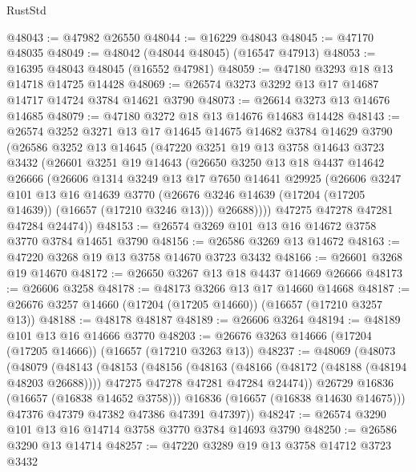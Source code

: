 \begin{lexlean}{RustStd}
\begin{coremodule}
@48043 := @47982 @26550
@48044 := @16229 @48043
@48045 := @47170 @48035
@48049 := @48042 (@48044 @48045) (@16547 @47913)
@48053 := @16395 @48043 @48045 (@16552 @47981)
@48059 := @47180 @3293 @18 @13 @14718 @14725 @14428
@48069 := @26574 @3273 @3292 @13 @17 @14687 @14717 @14724 @3784 @14621 @3790
@48073 := @26614 @3273 @13 @14676 @14685
@48079 := @47180 @3272 @18 @13 @14676 @14683 @14428
@48143 := @26574
    @3252
    @3271
    @13
    @17
    @14645
    @14675
    @14682
    @3784
    @14629
    @3790
    (@26586
      @3252
      @13
      @14645
      (@47220
        @3251
        @19
        @13
        @3758
        @14643
        @3723
        @3432
        (@26601
          @3251
          @19
          @14643
          (@26650
            @3250
            @13
            @18
            @4437
            @14642
            @26666
            (@26606
              @1314
              @3249
              @13
              @17
              @7650
              @14641
              @29925
              (@26606
                @3247
                @101
                @13
                @16
                @14639
                @3770
                (@26676 @3246 @14639 (@17204 (@17205 @14639)) (@16657 (@17210 @3246 @13)))
                @26688))))
        @47275
        @47278
        @47281
        @47284
        @24474))
@48153 := @26574 @3269 @101 @13 @16 @14672 @3758 @3770 @3784 @14651 @3790
@48156 := @26586 @3269 @13 @14672
@48163 := @47220 @3268 @19 @13 @3758 @14670 @3723 @3432
@48166 := @26601 @3268 @19 @14670
@48172 := @26650 @3267 @13 @18 @4437 @14669 @26666
@48173 := @26606 @3258
@48178 := @48173 @3266 @13 @17 @14660 @14668
@48187 := @26676 @3257 @14660 (@17204 (@17205 @14660)) (@16657 (@17210 @3257 @13))
@48188 := @48178 @48187
@48189 := @26606 @3264
@48194 := @48189 @101 @13 @16 @14666 @3770
@48203 := @26676 @3263 @14666 (@17204 (@17205 @14666)) (@16657 (@17210 @3263 @13))
@48237 := @48069
    (@48073
      (@48079
        (@48143
          (@48153
            (@48156
              (@48163
                (@48166 (@48172 (@48188 (@48194 @48203 @26688))))
                @47275
                @47278
                @47281
                @47284
                @24474))
            @26729
            @16836
            (@16657 (@16838 @14652 @3758)))
          @16836
          (@16657 (@16838 @14630 @14675)))
        @47376
        @47379
        @47382
        @47386
        @47391
        @47397))
@48247 := @26574 @3290 @101 @13 @16 @14714 @3758 @3770 @3784 @14693 @3790
@48250 := @26586 @3290 @13 @14714
@48257 := @47220 @3289 @19 @13 @3758 @14712 @3723 @3432

\end{coremodule}
\end{lexlean}
